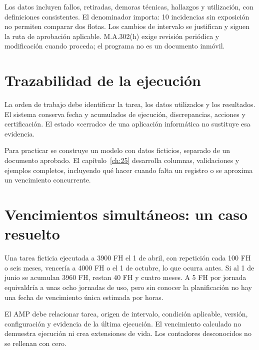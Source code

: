 Los datos incluyen fallos, retiradas, demoras técnicas, hallazgos y utilización, con definiciones consistentes. El denominador importa: 10 incidencias sin exposición no permiten comparar dos flotas. Los cambios de intervalo se justifican y siguen la ruta de aprobación aplicable. M.A.302(h) exige revisión periódica y modificación cuando proceda; el programa no es un documento inmóvil.
\section{Trazabilidad de la ejecución}
La orden de trabajo debe identificar la tarea, los datos utilizados y los resultados. El sistema conserva fecha y acumulados de ejecución, discrepancias, acciones y certificación. El estado «cerrado» de una aplicación informática no sustituye esa evidencia.

Para practicar se construye un modelo con datos ficticios, separado de un documento aprobado. El capítulo~\ref{ch:25} desarrolla columnas, validaciones y ejemplos completos, incluyendo qué hacer cuando falta un registro o se aproxima un vencimiento concurrente.
\section{Vencimientos simultáneos: un caso resuelto}
Una tarea ficticia ejecutada a 3900 FH el 1 de abril, con repetición cada 100 FH o seis meses, vencería a 4000 FH o el 1 de octubre, lo que ocurra antes. Si al 1 de junio se acumulan 3960 FH, restan 40 FH y cuatro meses. A 5 FH por jornada equivaldría a unas ocho jornadas de uso, pero sin conocer la planificación no hay una fecha de vencimiento única estimada por horas.

El AMP debe relacionar tarea, origen de intervalo, condición aplicable, versión, configuración y evidencia de la última ejecución. El vencimiento calculado no demuestra ejecución ni crea extensiones de vida. Los contadores desconocidos no se rellenan con cero.


